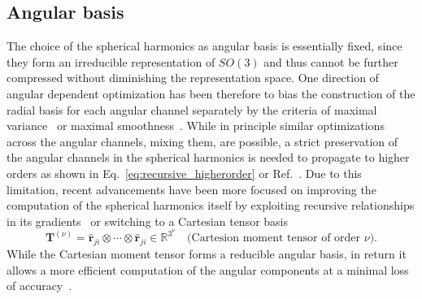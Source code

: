 \subsection{Angular basis}
The choice of the spherical harmonics as angular basis is essentially fixed, since they form an irreducible representation of $SO(3)$ and thus cannot be further compressed without diminishing the representation space. %
%
%
One direction of angular dependent optimization has been therefore to bias the construction of the radial basis for each angular channel separately by the criteria of maximal variance~\cite{goscinski2021optimal} or maximal smoothness~\cite{bigi2022smooth}.
While in principle similar optimizations across the angular channels, mixing them, are possible, a strict preservation of the angular channels in the spherical harmonics is needed to propagate to higher orders as shown in Eq.~\eqref{eq:recursive_higherorder} or Ref.~\cite{kondor_clebsch_2018}.
Due to this limitation, recent advancements have been more focused on improving the computation of the spherical harmonics itself by exploiting recursive relationships in its gradients~\cite{bigi2023sphericart} or switching to a Cartesian tensor basis~\cite{shapeev2016moment,schutt2021equivariant,simeon2023tensornet}
\begin{equation}
  \mathbf{T}^{(\nu)} = \hat{\mathbf{r}}_{ji} \otimes \cdots \otimes\hat{\mathbf{r}}_{ji}\in\mathbb{R}^{3^\nu}\quad \text{(Cartesion moment tensor of order $\nu$).}
\end{equation}
While the Cartesian moment tensor forms a reducible angular basis, in return it allows a more efficient computation of the angular components at a minimal loss of accuracy~\cite{zuo2020performance}.

